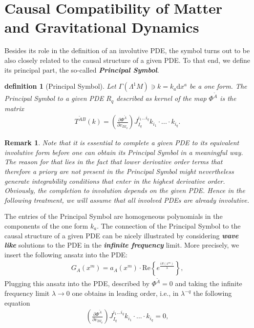 \documentclass[a4paper,12pt, DIV=14, BCOR=5mm, twoside, headsepline, numbers=noenddot]{scrbook}
\newtheorem{definition}{definition}[section]
\newtheorem*{remark}{Remark}
\begin{document}
\section{Causal Compatibility of Matter and Gravitational Dynamics}
Besides its role in the definition of an involutive PDE, the symbol turns out to be also closely related to the causal structure of a given PDE. To that end, we define its principal part, the so-called \textbf{\textit{Principal Symbol}}.
\begin{definition}[Principal Symbol] \label{PSym}
Let $\Gamma(\Lambda^1M) \ni k = k_{a} \mathrm{d}x^a$ be a one form. The Principal Symbol to a given PDE $R_q$ described as kernel of the map $\Phi^{\tilde{A}}$ is the matrix
\begin{align}
    T^{\tilde{A} B}(k) = \left ( \frac{\partial \Phi^{\tilde{A}}}{\partial v_{BI_q}} \right ) J_{I_q}^{i_1...i_q} k_{i_1} \cdot ... \cdot k_{i_q}.
\end{align}
\end{definition}
\begin{remark}
Note that it is essential to complete a given PDE to its equivalent involutive form before one can obtain its Principal Symbol in a meaningful way. The reason for that lies in the fact that lower derivative order terms that therefore a priory are not present in the Principal Symbol might nevertheless generate integrability conditions that enter in the highest derivative order. Obviously, the completion to involution depends on the given PDE. Hence in the following treatment, we will assume that all involved PDEs are already involutive.
\end{remark}
The entries of the Principal Symbol are homogeneous polynomials in the components of the one form $k_a$.
The connection of the Principal Symbol to the causal structure of a given PDE can be nicely illustrated by considering \textit{\textbf{wave like}} solutions to the PDE in the \textit{\textbf{infinite frequency}} limit. 
More precisely, we insert the following ansatz into the PDE:
\begin{align}\label{waveAns}
    G_A(x^m) = a_A(x^m) \cdot \mathrm{Re}\left \{ e^{\frac{iS(x^m)}{\lambda}} \right \},
\end{align}
Plugging this ansatz into the PDE, described by $\Phi^{\tilde{A}}=0$ and taking the infinite frequency limit $\lambda \rightarrow 0$ one obtains in leading order, i.e., in $\lambda^{-q}$ the following equation
\begin{align}
    \left ( \frac{\partial \Phi^{\tilde{A}}}{\partial v_{BI_q}} \right ) J_{I_q}^{i_1...i_q} k_{i_1} \cdot ... \cdot k_{i_q} = 0,
\end{align}
\end{document}
